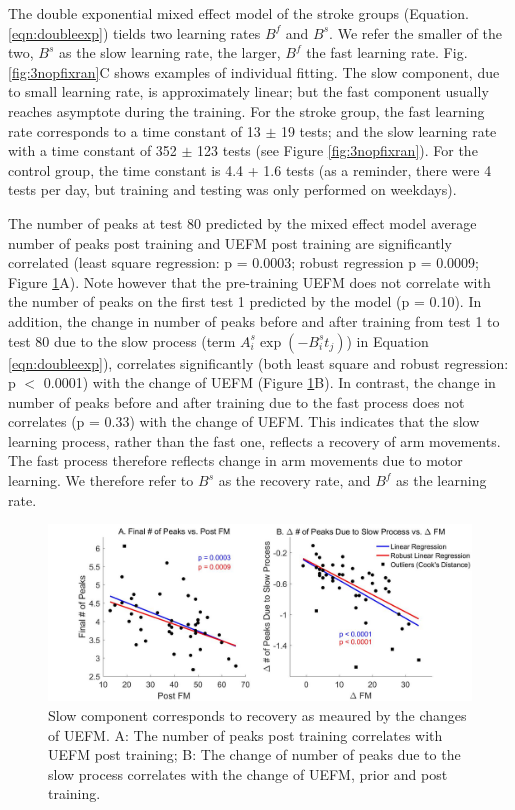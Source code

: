 The double exponential mixed effect model of the stroke groups (Equation. \ref{eqn:doubleexp}) tields two learning rates $ B^f $ and $ B^s $. 
We refer the smaller of the two, $ B^s $ as the slow learning rate, the larger, $ B^f $ the fast learning rate.
Fig. \ref{fig:3nopfixran}C shows examples of individual fitting.
The slow component, due to small learning rate, is approximately linear; but the fast component usually reaches asymptote during the training.
For the stroke group, the fast learning rate corresponds to a time constant of 13 $\pm$ 19 tests; and the slow learning rate with a time constant of 352 $\pm$ 123 tests (see Figure \ref{fig:3nopfixran}). 
For the control group, the time constant is 4.4 + 1.6 tests (as a reminder, there were 4 tests per day, but training and testing was only performed on weekdays). 

The number of peaks at test 80 predicted by the mixed effect model average number of peaks post training and UEFM post training are significantly correlated (least square regression: p = 0.0003; robust regression p = 0.0009; Figure \ref{fig:4slowcomponentisrecovery}A).
Note however that the pre-training UEFM does not correlate with the number of peaks on the first test 1 predicted by the model (p = 0.10).
In addition, the change in number of peaks before and after training from test 1 to test 80 due to the slow process (term $ A_i^s \exp(-B_i^s t_j) $) in Equation \ref{eqn:doubleexp}), correlates significantly (both least square and robust regression: p $<$ 0.0001) with the change of UEFM (Figure \ref{fig:4slowcomponentisrecovery}B). 
In contrast, the change in number of peaks before and after training due to the fast process does not correlates (p = 0.33) with the change of UEFM. 
This indicates that the slow learning process, rather than the fast one, reflects a recovery of arm movements. 
The fast process therefore reflects change in arm movements due to motor learning. 
We therefore refer to $ B^s $ as the recovery rate, and $ B^f $ as the learning rate.

\begin{figure}
	\centering
	\includegraphics[width=1\linewidth]{figures/4slowComponentIsRecovery}
	\caption[Slow component corresponds to recovery as meaured by the changes of UEFM]
	{Slow component corresponds to recovery as meaured by the changes of UEFM.
		A: The number of peaks post training correlates with UEFM post training;
		B: The change of number of peaks due to the slow process correlates with the change of UEFM, prior and post training.
	}
	\label{fig:4slowcomponentisrecovery}
\end{figure}

